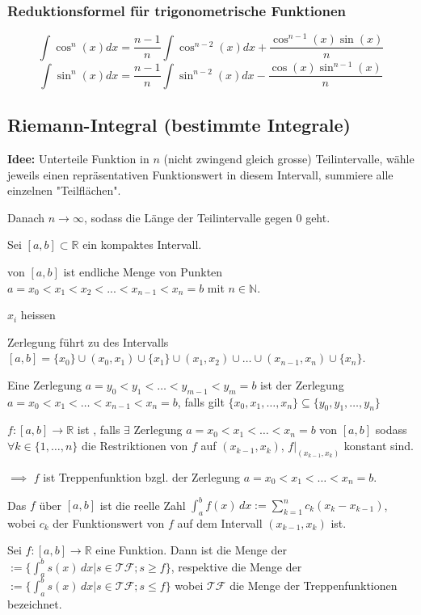 \subsubsection{Reduktionsformel für trigonometrische Funktionen}
$$\int \cos^n(x)dx = \frac{n-1}{n} \int \cos^{n-2}(x)dx + \frac{\cos^{n-1}(x)\sin(x)}{n}$$
$$\int \sin^n(x)dx = \frac{n-1}{n} \int \sin^{n-2}(x)dx - \frac{\cos(x)\sin^{n-1}(x)}{n}$$


\subsection{Riemann-Integral (bestimmte Integrale)}
\textbf{Idee:} Unterteile Funktion in $n$ (nicht zwingend gleich grosse) Teilintervalle, wähle jeweils einen repräsentativen Funktionswert in diesem Intervall, summiere alle einzelnen "Teilflächen".

Danach $n \rightarrow \infty$, sodass die Länge der Teilintervalle gegen $0$ geht.

Sei $[a,b] \subset \mathbb{R}$ ein kompaktes Intervall.

 von $[a,b]$ ist endliche Menge von Punkten $a=x_0 < x_1 < x_2 < ... < x_{n-1} < x_n = b$ mit $n \in \mathbb{N}$.

$x_i$ heissen 

Zerlegung führt zu  des Intervalls $[a,b] = \{x_0\} \cup (x_0, x_1) \cup \{x_1\} \cup (x_1, x_2) \cup \dots \cup (x_{n-1}, x_n) \cup \{x_n\}$.

Eine Zerlegung $a=y_0 < y_1 < \dots < y_{m-1} < y_m = b$ ist  der Zerlegung $a=x_0 < x_1 < \dots < x_{n-1} < x_n = b$, falls gilt $\{x_0, x_1, \dots, x_n\} \subseteq \{y_0, y_1, \dots, y_n\}$

$f: [a,b] \rightarrow \mathbb{R}$ ist , falls $\exists$ Zerlegung $a=x_0 < x_1 < \dots < x_n = b$ von $[a,b]$ sodass $\forall k \in \{1, \dots, n\}$ die Restriktionen von $f$ auf $(x_{k-1}, x_k)$, $f|_{(x_{k-1},x_k)}$ konstant sind.

$\implies$ $f$ ist Treppenfunktion bzgl. der Zerlegung $a=x_0 < x_1 < \dots < x_n = b$.

Das  $f$ über $[a,b]$ ist die reelle Zahl $\int_{a}^{b}f(x)\, dx := \sum_{k=1}^{n}c_k(x_k - x_{k-1})$, wobei $c_k$ der Funktionswert von $f$ auf dem Intervall $(x_{k-1}, x_k)$ ist.

Sei $f:[a,b] \rightarrow \mathbb{R}$ eine Funktion. 
Dann ist die Menge der $:=\{\int_{a}^{b}s(x)\, dx | s\in \mathcal{TF}; s \geq f\}$, 
respektive die Menge der $:=\{\int_{a}^{b}s(x)\, dx | s\in \mathcal{TF}; s \leq f\}$
wobei $\mathcal{TF}$ die Menge der Treppenfunktionen bezeichnet.

